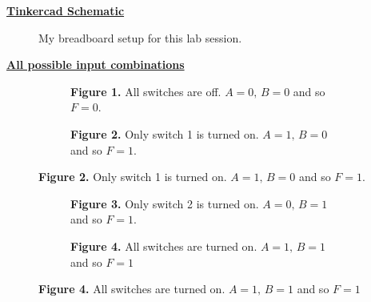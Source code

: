 \documentclass[a4paper]{article}
\begin{document}
\newpage
{}
\vspace*{\fill}
\begin{center}
  {\Huge\textbf{\underline{Tinkercad Schematic}}}
\end{center}
\vspace*{\fill}
\newpage
{}
\vspace*{\fill}
\begin{figure}[h]
  \centering
  \caption*{My breadboard setup for this lab session.}
  \label{fig:schem}
\end{figure}
\vspace*{\fill}
\newpage
{}
\vspace*{\fill}
\begin{center}
  {\Huge\textbf{\underline{All possible input combinations}}}
\end{center}
\vspace*{\fill}
\newpage
\begin{figure}
     \centering
     \begin{subfigure}[b]{0.9\textwidth}
         \centering
         \caption*{\textbf{Figure 1.} All switches are off. $A=0,\,B=0$ and so $F=0$.\vspace{2em}}
         \label{fig:alloff}
     \end{subfigure}
     \hfill
     \begin{subfigure}[b]{0.9\textwidth}
         \centering
         \caption*{\textbf{Figure 2. }Only switch 1 is turned on. $A=1,\,B=0$ and so $F=1$.}
         \label{fig:1on}
     \end{subfigure}
 \end{figure}
\newpage
\begin{figure}
     \centering
     \begin{subfigure}[b]{0.9\textwidth}
         \centering
         \caption*{\textbf{Figure 3.} Only switch 2 is turned on.  $A=0,\, B=1$ and so $F=1$.\vspace{2em}}
         \label{fig:2on}
     \end{subfigure}
     \hfill
     \begin{subfigure}[b]{0.9\textwidth}
         \centering
         \caption*{\textbf{Figure 4.} All switches are turned on. $A=1,\, B=1$ and so $F=1$}
         \label{fig:1on}
     \end{subfigure}
   \end{figure}
\end{document}
